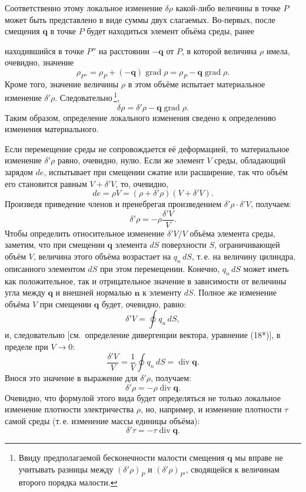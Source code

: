 \documentclass[a4paper,10pt]{article}
\begin{document}
Соответственно этому локальное изменение $\delta\rho$ какой-либо
величины в точке $P$ может быть представлено в виде суммы двух слагаемых.
Во-первых, после смещения $\mathbf{q}$ в точке $P$ будет находиться
элемент объёма среды, ранее


находившийся в точке $P''$ на расстоянии $-\mathbf{q}$ от $P$, в которой
величина $\rho$ имела, очевидно, значение
$$
    \rho_{P''} = \rho_P + (-\mathbf{q})\operatorname{grad}\rho
              = \rho_P - \mathbf{q}\operatorname{grad}\rho.
$$
Кроме того, значение величины $\rho$ в этом объёме испытает материальное
изменение $\delta'\rho$. Следовательно\,\footnote{Ввиду предполагаемой
бесконечности малости смещения $\mathbf{q}$ мы вправе не учитывать
разницы между $(\delta'\rho)_P$ и $(\delta'\rho)_{P'}$, сводящейся к
величинам второго порядка малости.},
\begin{equation}
    \delta\rho = \delta'\rho - \mathbf{q}\operatorname{grad}\rho.
    \tag{32.6}
\end{equation}
Таким образом, определение локального изменения сведено к определению
изменения материального.

Если перемещение среды не сопровождается её деформацией, то
материальное изменение $\delta'\rho$ равно, очевидно, нулю. Если же
элемент $V$ среды, обладающий зарядом $de$, испытывает при смещении
сжатие или расширение, так что объём его становится равным $V + \delta'V$,
то, очевидно,
$$
    de = \rho V = (\rho + \delta'\rho)(V + \delta'V).
$$
Произведя приведение членов и пренебрегая произведением
$\delta'\rho\cdot\delta'V$, получаем:
$$
    \delta'\rho = -\rho\frac{\delta'V}{V}.
$$
Чтобы определить относительное изменение $\delta'V/V$ объёма элемента
среды, заметим, что при смещении $\mathbf{q}$ элемента $dS$ поверхности
$S$, ограничивающей объём $V$, величина этого объёма возрастает на
$q_n\,dS$, т.\,е. на величину цилиндра, описанного элементом $dS$ при
этом перемещении. Конечно, $q_n\,dS$ может иметь как положительное, так
и отрицательное значение в зависимости от величины угла между
$\mathbf{q}$ и внешней нормалью $\mathbf{n}$ к элементу $dS$. Полное же
изменение объёма $V$ при смещении $\mathbf{q}$ будет, очевидно, равно:
$$
    \delta'V = \oint q_n\,dS,
$$
и, следовательно [см.\ определение дивергенции вектора, уравнение (18*)],
в пределе при $V \to 0$:
\begin{equation}
    \frac{\delta'V}{V} = \frac{1}{V}\oint q_n\,dS
                       = \operatorname{div}\mathbf{q}.
    \tag{32.7}
\end{equation}
Внося это значение в выражение для $\delta'\rho$, получаем:
\begin{equation}
    \delta'\rho = -\rho\operatorname{div}\mathbf{q}.
    \tag{32.8}
\end{equation}
Очевидно, что формулой этого вида будет определяться не только
локальное изменение плотности электричества $\rho$, но, например, и
изменение плотности $\tau$ самой среды (т.\,е. изменение массы единицы
объёма):
$$
    \delta'\tau = -\tau\operatorname{div}\mathbf{q}.
$$
\end{document}
